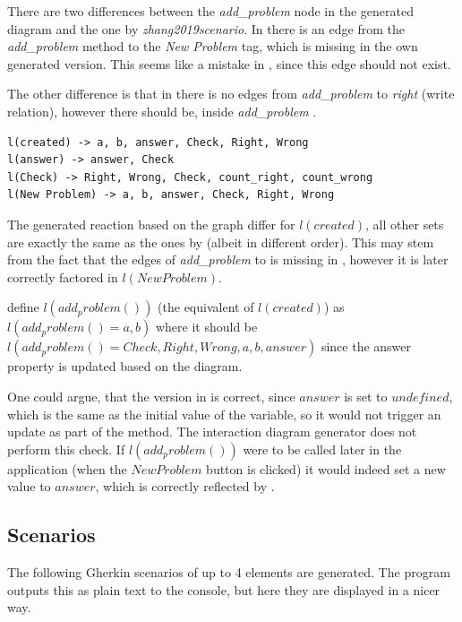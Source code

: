 There are two differences between the \textit{add\_problem} node in the generated diagram and the one by \textit{zhang2019scenario}.
In \textcite{zhang2019scenario} there is an edge from
the \textit{add\_problem} method to the \textit{New Problem} tag, which is missing in the own generated version. This seems like a mistake in \parencite{zhang2019scenario}, since this edge should not exist.

The other difference is that in \parencite{zhang2019scenario} there is no edges from \textit{add\_problem} to \textit{right} (write relation), however there should be, 
inside \textit{add\_problem} .

\begin{lstlisting}
l(created) -> a, b, answer, Check, Right, Wrong
l(answer) -> answer, Check
l(Check) -> Right, Wrong, Check, count_right, count_wrong
l(New Problem) -> a, b, answer, Check, Right, Wrong
\end{lstlisting}

The generated reaction based on the graph differ for $l(created)$, all other sets are exactly the same as the ones by \textcite{zhang2019scenario} (albeit in different order). This may stem from the fact that the edges of \textit{add\_problem} to  is missing in \parencite{zhang2019scenario}, however it is later correctly factored in $l(New Problem)$.

\textcite{zhang2019scenario} define $l(add_problem())$ 
(the equivalent of $l(created)$) as $l(add_problem() = 
{a, b})$ where it should be 
$l(add_problem() = {Check, Right, Wrong, a, b, answer })$ since the answer property is updated based on the diagram. 

One could argue, that the version in \parencite{zhang2019scenario} is correct, since $answer$ is set to $undefined$, which is the same as the initial value of the variable, so it would not trigger an update as part of the  method. The interaction diagram generator does not perform this check. If $l(add_problem())$ were to be called later in the application (when the $New Problem$ button is clicked) it would indeed set a new value to $answer$, which is correctly reflected by \textcite{zhang2019scenario}.


\subsection{Scenarios}
The following Gherkin scenarios of up to 4 elements are generated. The program outputs this as plain text to the console, but here they are displayed in a nicer way.


